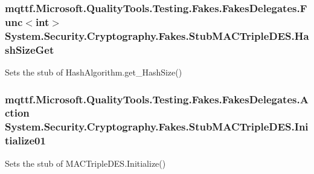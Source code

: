 \hypertarget{class_system_1_1_security_1_1_cryptography_1_1_fakes_1_1_stub_m_a_c_triple_d_e_s_a81f250776471579d62e272d641964d68}{
\subsubsection[{Hash\-Size\-Get}]{\setlength{\rightskip}{0pt plus 5cm}mqttf.\-Microsoft.\-Quality\-Tools.\-Testing.\-Fakes.\-Fakes\-Delegates.\-Func$<$int$>$ System.\-Security.\-Cryptography.\-Fakes.\-Stub\-M\-A\-C\-Triple\-D\-E\-S.\-Hash\-Size\-Get}}\label{class_system_1_1_security_1_1_cryptography_1_1_fakes_1_1_stub_m_a_c_triple_d_e_s_a81f250776471579d62e272d641964d68}


Sets the stub of Hash\-Algorithm.\-get\-\_\-\-Hash\-Size()

\hypertarget{class_system_1_1_security_1_1_cryptography_1_1_fakes_1_1_stub_m_a_c_triple_d_e_s_abb37472a1de3f6c4f34c8bd84eda2ce8}{
\subsubsection[{Initialize01}]{\setlength{\rightskip}{0pt plus 5cm}mqttf.\-Microsoft.\-Quality\-Tools.\-Testing.\-Fakes.\-Fakes\-Delegates.\-Action System.\-Security.\-Cryptography.\-Fakes.\-Stub\-M\-A\-C\-Triple\-D\-E\-S.\-Initialize01}}\label{class_system_1_1_security_1_1_cryptography_1_1_fakes_1_1_stub_m_a_c_triple_d_e_s_abb37472a1de3f6c4f34c8bd84eda2ce8}


Sets the stub of M\-A\-C\-Triple\-D\-E\-S.\-Initialize()

